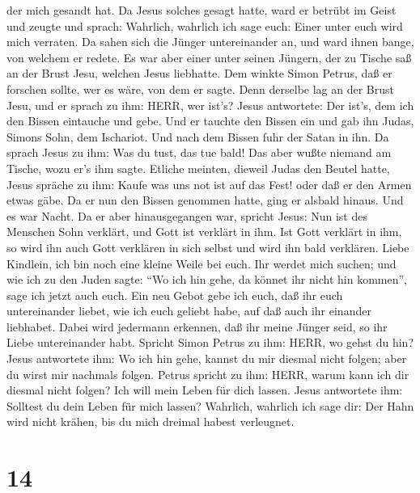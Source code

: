 der mich gesandt hat.  Da Jesus solches gesagt hatte, ward
er betrübt im Geist und zeugte und sprach: Wahrlich, wahrlich ich sage
euch: Einer unter euch wird mich verraten.  Da sahen sich
die Jünger untereinander an, und ward ihnen bange, von welchem er
redete.  Es war aber einer unter seinen Jüngern, der zu
Tische saß an der Brust Jesu, welchen Jesus liebhatte.  Dem
winkte Simon Petrus, daß er forschen sollte, wer es wäre, von dem er
sagte.  Denn derselbe lag an der Brust Jesu, und er sprach
zu ihm: HERR, wer ist's?  Jesus antwortete: Der ist's, dem
ich den Bissen eintauche und gebe. Und er tauchte den Bissen ein und gab
ihn Judas, Simons Sohn, dem Ischariot.  Und nach dem Bissen
fuhr der Satan in ihn. Da sprach Jesus zu ihm: Was du tust, das tue
bald!  Das aber wußte niemand am Tische, wozu er's ihm
sagte.  Etliche meinten, dieweil Judas den Beutel hatte,
Jesus spräche zu ihm: Kaufe was uns not ist auf das Fest! oder daß er
den Armen etwas gäbe.  Da er nun den Bissen genommen hatte,
ging er alsbald hinaus. Und es war Nacht.  Da er aber
hinausgegangen war, spricht Jesus: Nun ist des Menschen Sohn verklärt,
und Gott ist verklärt in ihm.  Ist Gott verklärt in ihm, so
wird ihn auch Gott verklären in sich selbst und wird ihn bald verklären.
 Liebe Kindlein, ich bin noch eine kleine Weile bei euch.
Ihr werdet mich suchen; und wie ich zu den Juden sagte: ``Wo ich hin
gehe, da könnet ihr nicht hin kommen'', sage ich jetzt auch euch.
 Ein neu Gebot gebe ich euch, daß ihr euch untereinander
liebet, wie ich euch geliebt habe, auf daß auch ihr einander liebhabet.
 Dabei wird jedermann erkennen, daß ihr meine Jünger seid,
so ihr Liebe untereinander habt.  Spricht Simon Petrus zu
ihm: HERR, wo gehst du hin? Jesus antwortete ihm: Wo ich hin gehe,
kannst du mir diesmal nicht folgen; aber du wirst mir nachmals folgen.
 Petrus spricht zu ihm: HERR, warum kann ich dir diesmal
nicht folgen? Ich will mein Leben für dich lassen.  Jesus
antwortete ihm: Solltest du dein Leben für mich lassen? Wahrlich,
wahrlich ich sage dir: Der Hahn wird nicht krähen, bis du mich dreimal
habest verleugnet.

\hypertarget{section-13}{%
\section{14}\label{section-13}}

